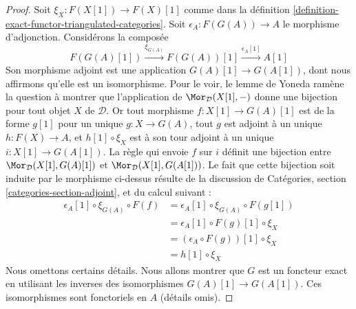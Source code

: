 \begin{proof}
Soit $\xi_X : F(X[1]) \to F(X)[1]$ comme dans la
définition \ref{definition-exact-functor-triangulated-categories}.
Soit $\epsilon_A : F(G(A)) \to A$ le morphisme d'adjonction.
Considérons la composée
$$
F(G(A)[1]) \xrightarrow{\xi_{G(A)}} F(G(A))[1] \xrightarrow{\epsilon_A[1]} A[1]
$$
Son morphisme adjoint est une application $G(A)[1] \to G(A[1])$, dont nous
affirmons qu'elle est un isomorphisme. Pour le voir, le lemme de Yoneda ramène
la question à montrer que l'application de $\Mor_\mathcal{D}(X[1], -)$ donne
une bijection pour tout objet $X$ de $\mathcal{D}$.
Or tout morphisme $f : X[1] \to G(A)[1]$ est de la forme $g[1]$ pour un unique
$g : X \to G(A)$, tout $g$ est adjoint à un unique $h : F(X) \to A$, et
$h[1] \circ \xi_X$ est à son tour adjoint à un unique
$i : X[1] \to G(A[1])$. La règle qui envoie $f$ sur $i$ définit une bijection
entre $\Mor_\mathcal{D}(X[1], G(A)[1])$ et
$\Mor_\mathcal{D}(X[1], G(A[1]))$.
Le fait que cette bijection soit induite par le morphisme ci-dessus résulte de
la discussion de Catégories, section \ref{categories-section-adjoint}, et du
calcul suivant :
\begin{align*}
\epsilon_A[1] \circ \xi_{G(A)} \circ F(f)
& =
\epsilon_A[1] \circ \xi_{G(A)} \circ F(g[1]) \\
& =
\epsilon_A[1] \circ F(g)[1] \circ \xi_X \\
& = 
(\epsilon_A \circ F(g))[1] \circ \xi_X \\
& =
h[1] \circ \xi_X
\end{align*}
Nous omettons certains détails. Nous allons montrer que $G$ est un foncteur
exact en utilisant les inverses des isomorphismes
$G(A)[1] \to G(A[1])$. Ces isomorphismes sont fonctoriels en $A$ (détails
omis).


\end{proof}

